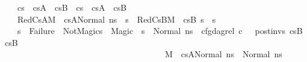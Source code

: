 \begin{isabellebody}
\ \ \ \ {\isachardoublequoteopen}cs{}\ {\isacharequal}{\kern0pt}\ cs{}A\ {\isacharat}{\kern0pt}\ cs{}B{\isachardoublequoteclose}\ \ {\isachardoublequoteopen}cs{}\ {\isacharequal}{\kern0pt}\ cs{}A\ {\isacharat}{\kern0pt}\ cs{}B{\isachardoublequoteclose}\ \isanewline
\ \ \ \ RedCs{}A{\isacharcolon}{\kern0pt}{\isachardoublequoteopen}M{\isacharcomma}{\kern0pt}{\isasymLambda}{\isacharcomma}{\kern0pt}{\isasymGamma}{\isacharcomma}{\kern0pt}{\isasymOmega}\ {\isasymturnstile}\ {\isasymlangle}cs{}A{\isacharcomma}{\kern0pt}Normal\ ns{}{\isasymrangle}\ {\isacharbrackleft}{\kern0pt}{\isasymrightarrow}{\isacharbrackright}{\kern0pt}\ s{\isacharprime}{\kern0pt}{\isacharprime}{\kern0pt}{\isachardoublequoteclose}\ \ RedCs{}B{\isacharcolon}{\kern0pt}{\isachardoublequoteopen}M{\isacharcomma}{\kern0pt}{\isasymLambda}{\isacharcomma}{\kern0pt}{\isasymGamma}{\isacharcomma}{\kern0pt}{\isasymOmega}\ {\isasymturnstile}\ {\isasymlangle}cs{}B{\isacharcomma}{\kern0pt}\ s{\isacharprime}{\kern0pt}{\isacharprime}{\kern0pt}{\isasymrangle}\ {\isacharbrackleft}{\kern0pt}{\isasymrightarrow}{\isacharbrackright}{\kern0pt}\ s{\isacharprime}{\kern0pt}{\isachardoublequoteclose}\ \ \ \ \isanewline
\ \ \ \ {\isachardoublequoteopen}s{\isacharprime}{\kern0pt}{\isacharprime}{\kern0pt}\ {\isasymnoteq}\ Failure{\isachardoublequoteclose}\ \ NotMagic{\isacharcolon}{\kern0pt}{\isachardoublequoteopen}{\isacharparenleft}{\kern0pt}s{\isacharprime}{\kern0pt}{\isacharprime}{\kern0pt}\ {\isasymnoteq}\ Magic\ {\isasymlongrightarrow}\ s{\isacharprime}{\kern0pt}{\isacharprime}{\kern0pt}\ {\isacharequal}{\kern0pt}\ Normal\ ns{}\ {\isasymand}\ cfg{\isacharunderscore}{\kern0pt}dag{\isacharunderscore}{\kern0pt}rel\ c\ {\isacharbrackleft}{\kern0pt}{\isacharbrackright}{\kern0pt}\ {\isacharbrackleft}{\kern0pt}{\isacharbrackright}{\kern0pt}\ post{\isacharunderscore}{\kern0pt}invs\ cs{}B\ cs{}B\ {\isasymand}\ \isanewline
\ \ \ \ \ \ \ \ \ \ \ \ \ \ \ \ \ \ \ \ \ \ \ \ \ \ \ \ \ \ \ \ \ \ \ \ \ \ \ {\isacharparenleft}{\kern0pt}M{\isacharcomma}{\kern0pt}{\isasymLambda}{\isacharcomma}{\kern0pt}{\isasymGamma}{\isacharcomma}{\kern0pt}{\isasymOmega}\ {\isasymturnstile}\ {\isasymlangle}cs{}A{\isacharcomma}{\kern0pt}Normal\ ns{}{\isasymrangle}\ {\isacharbrackleft}{\kern0pt}{\isasymrightarrow}{\isacharbrackright}{\kern0pt}\ Normal\ ns{}{\isacharparenright}{\kern0pt}{\isacharparenright}{\kern0pt}{\isachardoublequoteclose}\isanewline

\end{isabellebody}
